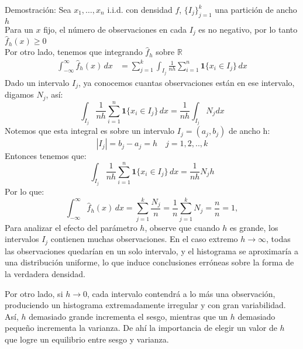 \documentclass[a4paper,11pt]{article}
\begin{document}
\begin{demostracion}{Demostración:}
    Sea \(x_1,\dots,x_n\) i.i.d. con densidad \(f\),  \(\{I_j\}_{j=1}^k\) una partición de ancho \(h\)\\
    Para un \(x\) fijo, el número de observaciones en cada \(I_j\) es no negativo, por lo tanto $\hat{f}_h(x)\geq0$\\

    Por otro lado, tenemos que integrando \(\hat f_h\) sobre \(\mathbb{R}\)
    \begin{align*}
        \int_{-\infty}^{\infty}\hat f_h(x)\,dx
         & = \sum_{j=1}^k \int_{I_j} \frac{1}{n h}\sum_{i=1}^n \mathbf{1}\{x_i\in I_j\}\,dx
    \end{align*}
    Dado un intervalo \(I_j\), ya conocemos cuantas observaciones están en ese intervalo, digamos $N_j$, así:
    \[
        \int_{I_j}\frac{1}{n h} \sum_{i=1}^n \mathbf{1}\{x_i\in I_j\}\,dx
        = \frac{1}{n h} \int_{I_j}N_jdx
    \]
    Notemos que esta integral es sobre un intervalo $I_j=(a_j,b_j)$ de ancho h:
    \[
        |I_j|=b_j-a_j=h\quad j=1,2,..,k
    \]
    Entonces tenemos que:
    \[
        \int_{I_j}\frac{1}{n h} \sum_{i=1}^n \mathbf{1}\{x_i\in I_j\}\,dx=\dfrac{1}{nh}N_jh
    \]
    Por lo que:
    \[
        \int_{-\infty}^{\infty}\hat f_h(x)\,dx = \sum_{j=1}^k \frac{N_j}{n} = \frac{1}{n}\sum_{j=1}^k N_j = \frac{n}{n}=1,
    \]
    Para analizar el efecto del parámetro $h$, observe que cuando $h$ es grande, los intervalos $I_j$ contienen muchas observaciones. En el caso extremo $h \to \infty$, todas las observaciones quedarían en un solo intervalo, y el histograma se aproximaría a una distribución uniforme, lo que induce conclusiones erróneas sobre la forma de la verdadera densidad.

    Por otro lado, si $h \to 0$, cada intervalo contendrá a lo más una observación, produciendo un histograma extremadamente irregular y con gran variabilidad.
    Así, $h$ demasiado grande incrementa el sesgo, mientras que un $h$ demasiado pequeño incrementa la varianza. De ahí la importancia de elegir un valor de $h$ que logre un equilibrio entre sesgo y varianza.

\end{demostracion}
\end{document}
